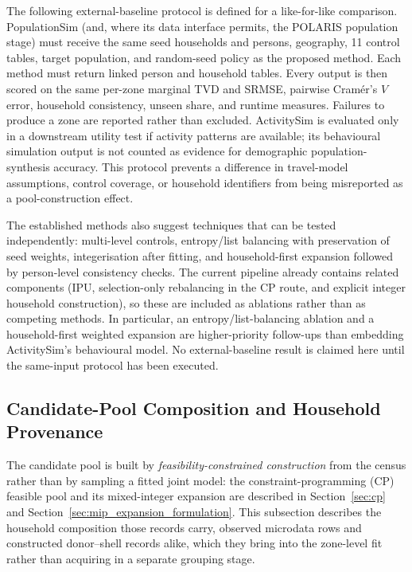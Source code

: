 \documentclass[review]{elsarticle}
\begin{document}
The following external-baseline protocol is defined for a like-for-like comparison.
PopulationSim (and, where its data interface permits, the POLARIS population stage)
must receive the same seed households and persons, geography, 11 control tables, target
population, and random-seed policy as the proposed method. Each method must return
linked person and household tables. Every output is then scored on the same per-zone
marginal TVD and SRMSE, pairwise Cram\'{e}r's $V$ error, household consistency, unseen
share, and runtime measures. Failures to produce a zone are reported rather than
excluded. ActivitySim is evaluated only in a downstream utility test if activity
patterns are available; its behavioural simulation output is not counted as evidence
for demographic population-synthesis accuracy. This protocol prevents a difference in
travel-model assumptions, control coverage, or household identifiers from being
misreported as a pool-construction effect.

The established methods also suggest techniques that can be tested independently:
multi-level controls, entropy/list balancing with preservation of seed weights,
integerisation after fitting, and household-first expansion followed by person-level
consistency checks. The current pipeline already contains related components (IPU,
selection-only rebalancing in the CP route, and explicit integer household
construction), so these are included as ablations rather than as competing methods. In particular, an entropy/list-balancing ablation and a household-first
weighted expansion are higher-priority follow-ups than embedding ActivitySim's
behavioural model. No external-baseline result is claimed here until the same-input
protocol has been executed.

\subsection{Candidate-Pool Composition and Household Provenance}
\label{sec:pool_construction}

The candidate pool is built by \emph{feasibility-constrained construction} from the census rather than by sampling a fitted joint model: the constraint-programming (CP) feasible pool and its mixed-integer expansion are described in Section~\ref{sec:cp} and Section~\ref{sec:mip_expansion_formulation}. This subsection describes the household composition those records carry, observed microdata rows and constructed donor--shell records alike, which they bring into the zone-level fit rather than acquiring in a separate grouping stage.
\end{document}
